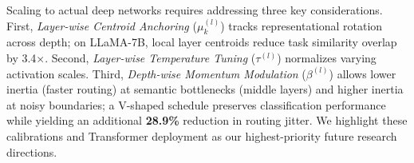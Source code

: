 Scaling to actual deep networks requires addressing three key considerations. First, \emph{Layer-wise Centroid Anchoring} ($\mu_k^{(l)}$) tracks representational rotation across depth; on LLaMA-7B, local layer centroids reduce task similarity overlap by 3.4$\times$. Second, \emph{Layer-wise Temperature Tuning} ($\tau^{(l)}$) normalizes varying activation scales. Third, \emph{Depth-wise Momentum Modulation} ($\beta^{(l)}$) allows lower inertia (faster routing) at semantic bottlenecks (middle layers) and higher inertia at noisy boundaries; a V-shaped schedule preserves classification performance while yielding an additional \textbf{28.9\%} reduction in routing jitter. We highlight these calibrations and Transformer deployment as our highest-priority future research directions.
